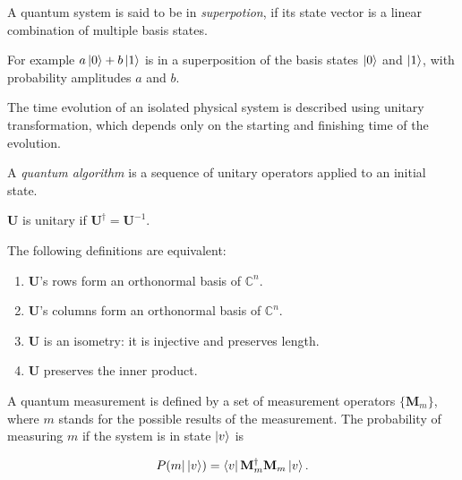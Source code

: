 \begin{definition}[Superposition]

A quantum system is said to be in \textit{superpotion}, if its state vector is a linear combination of multiple basis states.

For example $a\ket{0} + b\ket{1}$ is in a superposition of the basis states $\ket{0}$ and $\ket{1}$, with probability amplitudes $a$ and $b$.

\end{definition}


The time evolution of an isolated physical system is described using unitary transformation, which depends only on the starting and finishing time of the evolution.

A \textit{quantum algorithm} is a sequence of unitary operators applied to an initial state.

\begin{definition}

$\mathbf{U}$ is unitary if $\mathbf{U}^{\dagger} = \mathbf{U}^{-1}$.


The following definitions are equivalent:

\begin{enumerate}
    \item $\mathbf{U}$'s rows form an orthonormal basis of $\mathds{C}^n$.
    \item $\mathbf{U}$'s columns form an orthonormal basis of $\mathds{C}^n$.
    \item $\mathbf{U}$ is an isometry: it is injective and preserves length.
    \item $\mathbf{U}$ preserves the inner product.
\end{enumerate}

\end{definition}


A quantum measurement is defined by a set of measurement operators $\{\mathbf{M}_m\}$, where $m$ stands for the possible results of the measurement. The probability of measuring $m$ if the system is in state $\ket{v}$ is

\begin{align*}
    P(m | \ket{v}) = \bra{v} \mathbf{M}_m^{\dagger} \mathbf{M}_m \ket{v}.
\end{align*}


